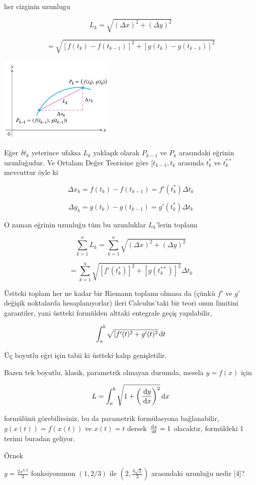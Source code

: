 \documentclass[12pt,fleqn]{article}\usepackage{../../common}
\begin{document}
her cizginin uzunlugu 

$$
L_k = \sqrt{(\Delta x)^2 + (\Delta y)^2}
$$

$$
= \sqrt{[f(t_k) - f(t_{k-1})]^2 + [g(t_k) - g(t_{k-1})]^2 }
$$

\includegraphics[width=15em]{calc_multi_06_03.png}

Eğer $\delta t_k$ yeterince ufaksa $L_k$ yaklaşık olarak $P_{k-1}$ ve $P_k$
arasındaki eğrinin uzunluğudur. Ve Ortalam Değer Teorisine göre
$[t_{k-1},t_k$ arasında $t_k^\ast$ ve $t_k^{**}$ mevcuttur öyle ki 

$$
\Delta x_k = f(t_k) - f(t_{k-1}) = f'(t_k^\ast) \Delta t_k
$$

$$
\Delta y_k = g(t_k) - g(t_{k-1}) = g'(t_k^\ast) \Delta t_k
$$

O zaman eğrinin uzunluğu tüm bu uzunluklar $L_k$'lerin toplamı 

$$
\sum_{k=1}^{n} L_k = \sum_{k=1}^{n} \sqrt{(\Delta x)^2 + (\Delta y)^2} 
$$

$$
= \sum_{k=1}^{n} \sqrt{[f'(t_k^\ast)]^2 + [g(t_k^{**})]^2} \Delta t_k
$$

Üstteki toplam her ne kadar bir Riemann toplamı olmasa da (çünkü $f'$ ve $g'$
değişik noktalarda hesaplanıyorlar) ileri Calculus'taki bir teori onun limitini
garantiler, yani üstteki formülden alttaki entegrale geçiş yapılabilir,

$$
\int_{a}^{b} \sqrt{[f'(t)^2 + g'(t)^2} \,\mathrm{d} t
$$

Üç boyutlu eğri için tabii ki üstteki kalıp genişletilir.

Bazen tek boyutlu, klasik, parametrik olmayan durumda, mesela $y = f(x)$ için

$$
L = \int_{a}^{b} \sqrt{1 + \left( \frac{\,\mathrm{d} y}{\,\mathrm{d} x} \right)^2} \,\mathrm{d} x 
$$

formülünü görebilirsiniz, bu da parametrik formülasyona bağlanabilir, $y(x(t))
= f(x(t))$ ve $x(t) = t$ dersek $\frac{\,\mathrm{d} x}{\,\mathrm{d} t} = 1$ olacaktır,
formüldeki 1 terimi buradan geliyor.

Örnek

$y = \frac{2 x ^{3/2}}{3}$ fonksiyonunun $(1,2/3)$ ile $(2,\frac{4\sqrt{2}}{3})$ 
arasındaki uzunluğu nedir [4]? 
\end{document}
